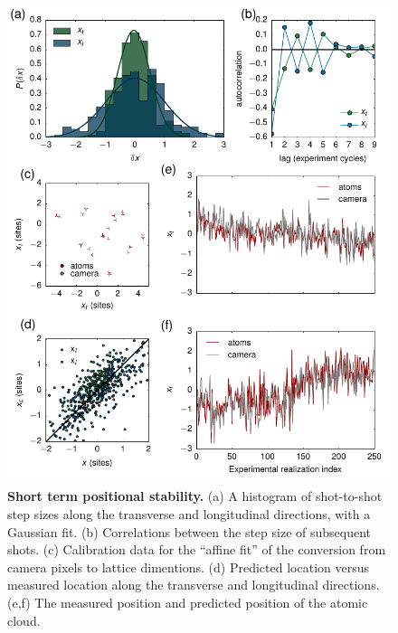 \documentclass[twocolumn,aps,pra,showpacs,preprintnumbers,bibnotes]{revtex4-1}
\begin{document}
\begin{figure}
  \begin{center}
    \includegraphics{fig/pointing_figure.pdf}
    \caption{\textbf{Short term positional stability.} (a) A histogram of shot-to-shot step sizes along the transverse and longitudinal directions, with a Gaussian fit. (b) Correlations between the step size of subsequent shots. (c) Calibration data for the ``affine fit'' of the conversion from camera pixels to lattice dimentions. (d) Predicted location versus measured location along the transverse and longitudinal directions. (e,f) The measured position and predicted position of the atomic cloud.}\label{fig:stability}
  \end{center}
\end{figure}
\end{document}
